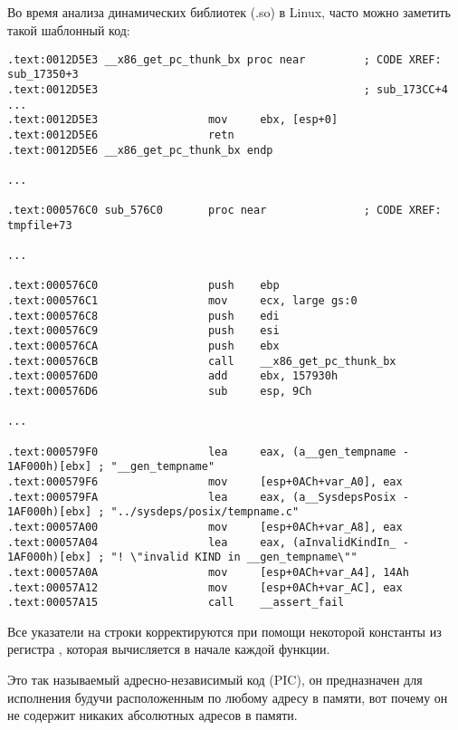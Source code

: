 \subsection{\CapitalPICcode}
\myindex{\PICcode}
\label{sec:PIC}

Во время анализа динамических библиотек (.so) в Linux, часто можно заметить такой шаблонный код:

\begin{lstlisting}[caption=libc-2.17.so x86]
.text:0012D5E3 __x86_get_pc_thunk_bx proc near         ; CODE XREF: sub_17350+3
.text:0012D5E3                                         ; sub_173CC+4 ...
.text:0012D5E3                 mov     ebx, [esp+0]
.text:0012D5E6                 retn
.text:0012D5E6 __x86_get_pc_thunk_bx endp

...

.text:000576C0 sub_576C0       proc near               ; CODE XREF: tmpfile+73

...

.text:000576C0                 push    ebp
.text:000576C1                 mov     ecx, large gs:0
.text:000576C8                 push    edi
.text:000576C9                 push    esi
.text:000576CA                 push    ebx
.text:000576CB                 call    __x86_get_pc_thunk_bx
.text:000576D0                 add     ebx, 157930h
.text:000576D6                 sub     esp, 9Ch

...

.text:000579F0                 lea     eax, (a__gen_tempname - 1AF000h)[ebx] ; "__gen_tempname"
.text:000579F6                 mov     [esp+0ACh+var_A0], eax
.text:000579FA                 lea     eax, (a__SysdepsPosix - 1AF000h)[ebx] ; "../sysdeps/posix/tempname.c"
.text:00057A00                 mov     [esp+0ACh+var_A8], eax
.text:00057A04                 lea     eax, (aInvalidKindIn_ - 1AF000h)[ebx] ; "! \"invalid KIND in __gen_tempname\""
.text:00057A0A                 mov     [esp+0ACh+var_A4], 14Ah
.text:00057A12                 mov     [esp+0ACh+var_AC], eax
.text:00057A15                 call    __assert_fail
\end{lstlisting}

Все указатели на строки корректируются при помощи некоторой константы из регистра \EBX, которая вычисляется в начале каждой функции.

Это так называемый адресно-независимый код (\ac{PIC}), он предназначен для исполнения будучи расположенным по любому адресу в памяти, вот почему он не содержит никаких абсолютных адресов в памяти.

